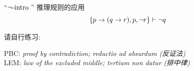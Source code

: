 \begin{frame}{}
  \begin{exampleblock}{``$\lnot\text{-intro}\;$'' 推理规则的应用}
    \[
      \{p \to (q \to r), p, \lnot r\} \vdash \lnot q
    \]
  \end{exampleblock}

\end{frame}

\begin{frame}{}
\end{frame}

\begin{frame}{}
	\begin{exampleblock}{请自行练习:}
		\begin{center}
			PBC: {\it proof by contradiction; reductio ad absurdum (反证法)} \\[3pt]
			LEM: {\it law of the excluded middle; tertium non datur (排中律)}
		\end{center}
	\end{exampleblock}
\end{frame}

